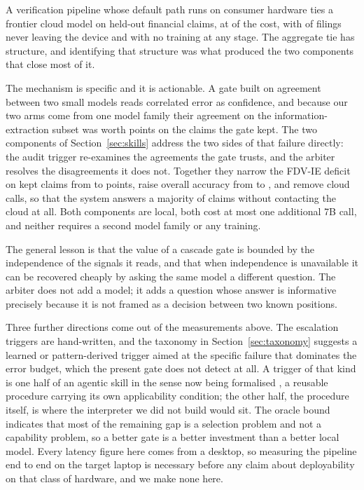 \documentclass{article}
\begin{document}
A verification pipeline whose default path runs on consumer hardware ties a frontier cloud
model on \nTest{} held-out financial claims, at \costRatioFull{} of the cost, with
\fullOnDeviceRate{} of filings never leaving the device and with no training at any stage.
The aggregate tie has structure, and identifying that structure was what produced the two
components that close most of it.

The mechanism is specific and it is actionable. A gate built on agreement between two small
models reads correlated error as confidence, and because our two arms come from one model
family their agreement on the information-extraction subset was worth
\keptLocalIEGap{} points on the claims the gate kept. The two components of
Section~\ref{sec:skills} address the two sides of that failure directly: the audit trigger
re-examines the agreements the gate trusts, and the arbiter resolves the disagreements it
does not. Together they narrow the FDV-IE deficit on kept claims from \keptLocalIEGap{} to
\fullKeptLocalIEGap{} points, raise overall accuracy from \accRouted{} to \accFull{}, and
remove \arbKept{} cloud calls, so that the system answers a majority of claims without
contacting the cloud at all. Both components are local, both cost at most one additional 7B
call, and neither requires a second model family or any training.

The general lesson is that the value of a cascade gate is bounded by the independence of the
signals it reads, and that when independence is unavailable it can be recovered cheaply by
asking the same model a different question. The arbiter does not add a model; it adds a
question whose answer is informative precisely because it is not framed as a decision
between two known positions.

Three further directions come out of the measurements above. The escalation triggers are
hand-written, and the taxonomy in Section~\ref{sec:taxonomy} suggests a learned or
pattern-derived trigger aimed at the specific failure that dominates the error budget, which
the present gate does not detect at all. A trigger of that kind is one half of an agentic
skill in the sense now being formalised \citep{jiang2026skills}, a reusable procedure
carrying its own applicability condition; the other half, the procedure itself, is where the
interpreter we did not build would sit. The oracle bound indicates that most of the
remaining gap is a selection problem and not a capability problem, so a better gate is a
better investment than a better local model. Every latency figure here comes from a desktop,
so measuring the pipeline end to end on the target laptop is necessary before any claim
about deployability on that class of hardware, and we make none here.
\end{document}
